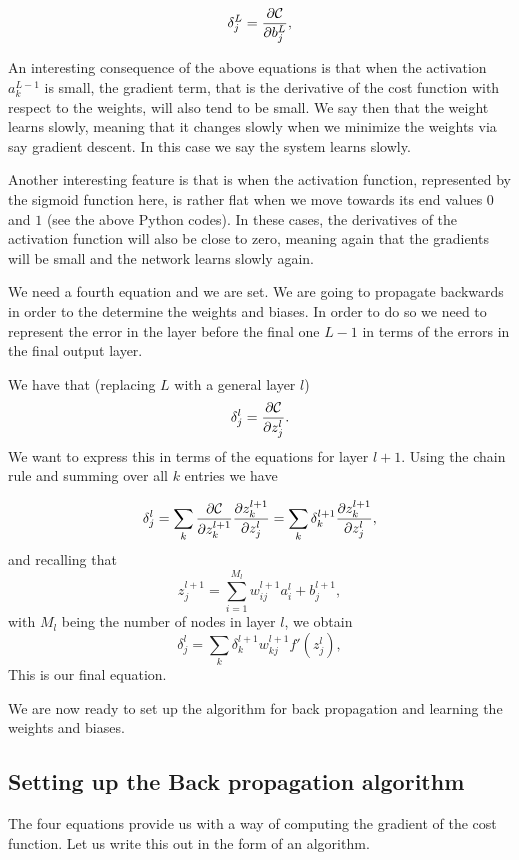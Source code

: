 \begin{equation}
\delta_j^L = \frac{\partial {\cal C}}{\partial b_j^L},
\end{equation}



An interesting consequence of the above equations is that when the
activation $a_k^{L-1}$ is small, the gradient term, that is the
derivative of the cost function with respect to the weights, will also
tend to be small. We say then that the weight learns slowly, meaning
that it changes slowly when we minimize the weights via say gradient
descent. In this case we say the system learns slowly.

Another interesting feature is that is when the activation function,
represented by the sigmoid function here, is rather flat when we move towards
its end values $0$ and $1$ (see the above Python codes). In these
cases, the derivatives of the activation function will also be close
to zero, meaning again that the gradients will be small and the
network learns slowly again.

We need a fourth equation and we are set. We are going to propagate
backwards in order to the determine the weights and biases. In order
to do so we need to represent the error in the layer before the final
one $L-1$ in terms of the errors in the final output layer.

We have that (replacing $L$ with a general layer $l$)
\[
\delta_j^l =\frac{\partial {\cal C}}{\partial z_j^l}.
\]
We want to express this in terms of the equations for layer $l+1$. Using the chain rule and summing over all $k$ entries we have

\[
\delta_j^l =\sum_k \frac{\partial {\cal C}}{\partial z_k^{l+1}}\frac{\partial z_k^{l+1}}{\partial z_j^{l}}=\sum_k \delta_k^{l+1}\frac{\partial z_k^{l+1}}{\partial z_j^{l}},
\]
and recalling that
\[
z_j^{l+1} = \sum_{i=1}^{M_{l}}w_{ij}^{l+1}a_i^{l}+b_j^{l+1},
\]
with $M_l$ being the number of nodes in layer $l$, we obtain
\[
\delta_j^l =\sum_k \delta_k^{l+1}w_{kj}^{l+1}f'(z_j^l),
\]
This is our final equation.

We are now ready to set up the algorithm for back propagation and learning the weights and biases.

\subsection*{Setting up the Back propagation algorithm}

The four equations  provide us with a way of computing the gradient of the cost function. Let us write this out in the form of an algorithm.


